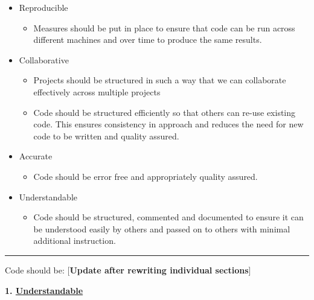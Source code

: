 \documentclass[]{book}
\providecommand{\tightlist}{%
  \setlength{\itemsep}{0pt}\setlength{\parskip}{0pt}}
\begin{document}
\begin{itemize}
\tightlist
\item
  Reproducible

  \begin{itemize}
  \tightlist
  \item
    Measures should be put in place to ensure that code can be run across different machines and over time to produce the same results.\\
  \end{itemize}
\item
  Collaborative

  \begin{itemize}
  \tightlist
  \item
    Projects should be structured in such a way that we can collaborate effectively across multiple projects
  \item
    Code should be structured efficiently so that others can re-use existing code. This ensures consistency in approach and reduces the need for new code to be written and quality assured.\\
  \end{itemize}
\item
  Accurate

  \begin{itemize}
  \tightlist
  \item
    Code should be error free and appropriately quality assured.\\
  \end{itemize}
\item
  Understandable

  \begin{itemize}
  \tightlist
  \item
    Code should be structured, commented and documented to ensure it can be understood easily by others and passed on to others with minimal additional instruction.
  \end{itemize}
\end{itemize}

\begin{center}\rule{0.5\linewidth}{\linethickness}\end{center}

Code should be:
{[}\textbf{Update after rewriting individual sections}{]}

\textbf{1. \protect\hyperlink{understand}{Understandable}}
\end{document}
